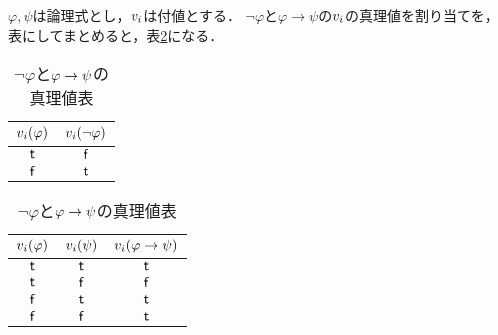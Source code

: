 \begin{myRemark}[真理値表]
  $\varphi, \psi$は論理式とし，$v_i$は付値とする．
  $\lnot \varphi$と$\varphi \to \psi$の$v_i$の真理値を割り当てを，
  表にしてまとめると，表\ref{table:prop:not-limp}になる．
  \begin{table}[H]
    \begin{subtable}{.48\linewidth}
      \centering
      \begin{tabular}{|c|c|}\hline
        $v_i(\varphi)$ & $v_i(\lnot\varphi)$ \\ \hline
        $\mathsf{t}$                                  & $\mathsf{f}$                                      \\ \hline
        $\mathsf{f}$                                 & $\mathsf{t}$                                       \\ \hline
      \end{tabular}
    \end{subtable}
    \begin{subtable}{.48\linewidth}\centering
      \centering
      \begin{tabular}{|c|c|c|}\hline
        $v_i(\varphi)$ & $v_i(\psi)$ & $v_i(\varphi \to \psi)$ \\ \hline
        $\mathsf{t}$                                  & $\mathsf{t}$                               & $\mathsf{t}$                                             \\ \hline
        $\mathsf{t}$                                  & $\mathsf{f}$                              & $\mathsf{f}$                                            \\ \hline
        $\mathsf{f}$                                 & $\mathsf{t}$                               & $\mathsf{t}$                                             \\ \hline
        $\mathsf{f}$                                 & $\mathsf{f}$                              & $\mathsf{t}$                                             \\ \hline
      \end{tabular}
    \end{subtable}
    \caption{$\lnot \varphi$と$\varphi \to \psi$の真理値表}
    \label{table:prop:not-limp}
  \end{table}
\end{myRemark}

